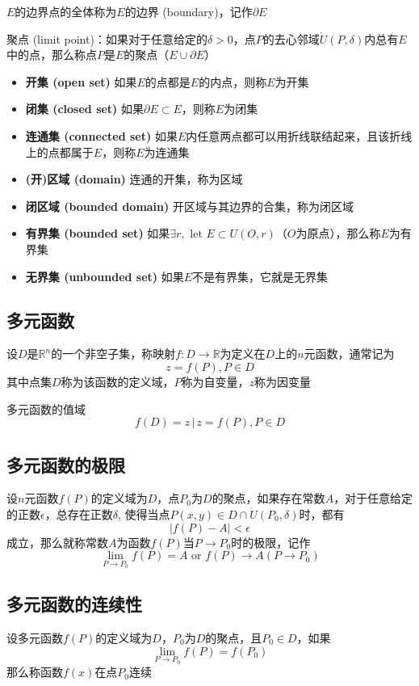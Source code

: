 \documentclass[UTF8]{ctexart}
\begin{document}
$E$的边界点的全体称为$E$的边界 (boundary)，记作$\partial E$

聚点 (limit point)：如果对于任意给定的$\delta>0$，点$P$的去心邻域$\mathring{U}(P,\delta)$内总有$E$中的点，那么称点$P$是$E$的聚点（$E\cup\partial E$）

\begin{itemize}
  \item {\bf 开集 (open set)} 如果$E$的点都是$E$的内点，则称$E$为开集
  \item {\bf 闭集 (closed set)} 如果$\partial E\subset E$，则称$E$为闭集
  \item {\bf 连通集 (connected set)} 如果$E$内任意两点都可以用折线联结起来，且该折线上的点都属于$E$，则称$E$为连通集
  \item {\bf (开)区域 (domain)} 连通的开集，称为区域
  \item {\bf 闭区域 (bounded domain)} 开区域与其边界的合集，称为闭区域
  \item {\bf 有界集 (bounded set)} 如果$\exists r, \text{ let }E\subset U(O,r)$（$O$为原点），那么称$E$为有界集
  \item {\bf 无界集 (unbounded set)} 如果$E$不是有界集，它就是无界集
\end{itemize}

\subsection*{多元函数}
设$D$是$\mathbb{R}^n$的一个非空子集，称映射$f:D\to\mathbb{R}$为定义在$D$上的$n$元函数，通常记为
\[z=f(P),P\in D\]
其中点集$D$称为该函数的定义域，$P$称为自变量，$z$称为因变量

多元函数的值域
\[f(D)={z\,|\,z=f(P),P\in D}\]

\subsection*{多元函数的极限}
设$n$元函数$f(P)$的定义域为$D$，点$P_0$为$D$的聚点，如果存在常数$A$，对于任意给定的正数$\epsilon$，总存在正数$\delta$,
使得当点$P(x,y)\in D\cap\mathring{U}(P_0,\delta)$时，都有
\[ |f(P)-A|<\epsilon \]
成立，那么就称常数$A$为函数$f(P)$当$P\to P_0$时的极限，记作
\[ \lim_{P\to P_0}f(P)=A\text{ or }f(P)\to A(P\to P_0) \]

\subsection*{多元函数的连续性}
设多元函数$f(P)$的定义域为$D$，$P_0$为$D$的聚点，且$P_0\in D$，如果
\[\lim_{P\to P_0}f(P)=f(P_0)\]
那么称函数$f(x)$在点$P_0$连续
\end{document}
